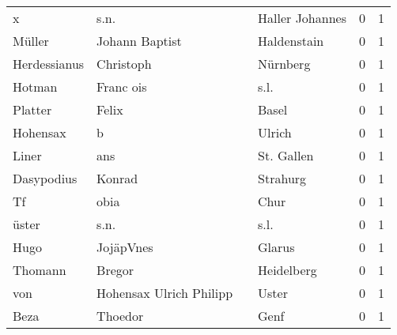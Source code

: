 \begin{center}
\begin{tiny}
\begin{longtabu}{llllrr}
                        x &                               s.n. &             &                             Haller Johannes &          0 &         1 \\
                   Müller &                     Johann Baptist &             &                                 Haldenstain &          0 &         1 \\
             Herdessianus &                          Christoph &             &                                    Nürnberg &          0 &         1 \\
                   Hotman &                          Franc ois &             &                                        s.l. &          0 &         1 \\
                  Platter &                              Felix &             &                                       Basel &          0 &         1 \\
                 Hohensax &                                  b &             &                                      Ulrich &          0 &         1 \\
                    Liner &                                ans &             &                                  St. Gallen &          0 &         1 \\
               Dasypodius &                             Konrad &             &                                    Strahurg &          0 &         1 \\
                       Tf &                               obia &             &                                        Chur &          0 &         1 \\
                    üster &                               s.n. &             &                                        s.l. &          0 &         1 \\
                     Hugo &                          JojäpVnes &             &                                      Glarus &          0 &         1 \\
                  Thomann &                             Bregor &             &                                  Heidelberg &          0 &         1 \\
                      von &            Hohensax Ulrich Philipp &             &                                       Uster &          0 &         1 \\
                     Beza &                            Thoedor &             &                                        Genf &          0 &         1 \\

\end{longtabu}
\end{tiny}
\end{center}
